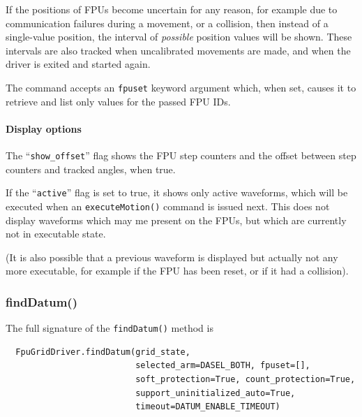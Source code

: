 \documentclass[11pt,a4paper]{scrartcl}
\begin{document}
If the positions of FPUs become uncertain for any reason, for example
due to communication failures during a movement, or a collision, then
instead of a single-value position, the interval of \emph{possible}
position values will be shown.  These intervals are also tracked when
uncalibrated movements are made, and when the driver is exited and
started again.


The command accepts an \texttt{fpuset} keyword argument which, when
set, causes it to retrieve and list only values for the passed FPU
IDs.

\paragraph{Display options}

The ``\texttt{show\_offset}'' flag shows the FPU step counters and
the offset between step counters and tracked angles, when
true.

If the ``\texttt{active}'' flag is set to true, it shows only active
waveforms, which will be executed when an \texttt{executeMotion()}
command is issued next. This does not display waveforms which may me
present on the FPUs, but which are currently not in executable state.

(It is also possible that a previous waveform is displayed but
actually not any more executable, for example if the FPU has been
reset, or if it had a collision).

\subsubsection{findDatum()}
\label{sec:finddatum}

The full signature of the \texttt{findDatum()} method is

\begin{verbatim}
  FpuGridDriver.findDatum(grid_state,
                          selected_arm=DASEL_BOTH, fpuset=[],
                          soft_protection=True, count_protection=True, 
                          support_uninitialized_auto=True,
                          timeout=DATUM_ENABLE_TIMEOUT)
\end{verbatim}
\end{document}
